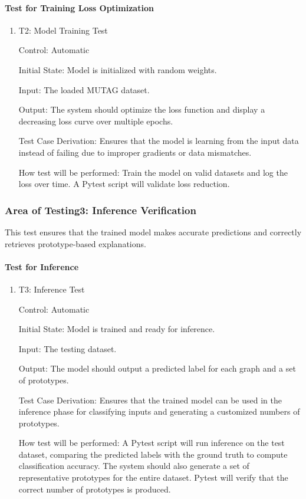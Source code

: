 \documentclass[12pt, titlepage]{article}
\begin{document}
\paragraph{Test for Training Loss Optimization}

\begin{enumerate}
					
\item{T2: Model Training Test\\}

Control: Automatic
					
Initial State: Model is initialized with random weights.
					
Input: The loaded MUTAG dataset.
					
Output: The system should optimize the loss function and display a decreasing loss curve over multiple epochs.

Test Case Derivation: Ensures that the model is learning from the input data instead of failing due to improper gradients or data mismatches.

How test will be performed: Train the model on valid datasets and log the loss over time. A Pytest script will validate loss reduction.

\end{enumerate}

\subsubsection{Area of Testing3: Inference Verification}
This test ensures that the trained model makes accurate predictions and correctly retrieves prototype-based explanations.

\paragraph{Test for Inference}

\begin{enumerate}
					
\item{T3: Inference Test\\}

Control: Automatic
					
Initial State: Model is trained and ready for inference.
					
Input: The testing dataset.
					
Output: The model should output a predicted label for each graph and a set of prototypes.

Test Case Derivation: Ensures that the trained model can be used in the inference phase for classifying inputs and generating a customized numbers of prototypes.

How test will be performed: A Pytest script will run inference on the test dataset, comparing the predicted labels with the ground truth to compute classification accuracy. The system should also generate a set of representative prototypes for the entire dataset. Pytest will verify that the correct number of prototypes is produced.

\end{enumerate}
\end{document}
